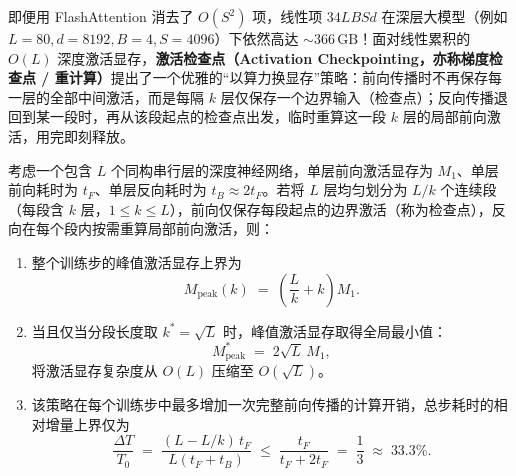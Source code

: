 即便用 FlashAttention 消去了 $O(S^2)$ 项，线性项 $34 L B S d$ 在深层大模型（例如 $L = 80, d = 8192, B = 4, S = 4096$）下依然高达 $\sim 366\,\mathrm{GB}$！面对线性累积的 $O(L)$ 深度激活显存，\textbf{激活检查点（Activation Checkpointing，亦称梯度检查点 / 重计算）}提出了一个优雅的“以算力换显存”策略：前向传播时不再保存每一层的全部中间激活，而是每隔 $k$ 层仅保存一个边界输入（检查点）；反向传播退回到某一段时，再从该段起点的检查点出发，临时重算这一段 $k$ 层的局部前向激活，用完即刻释放。

\begin{thmBox}
\begin{theorem}
\label{thm:activation-checkpointing}
考虑一个包含 $L$ 个同构串行层的深度神经网络，单层前向激活显存为 $M_1$、单层前向耗时为 $t_F$、单层反向耗时为 $t_B \approx 2 t_F$。若将 $L$ 层均匀划分为 $L / k$ 个连续段（每段含 $k$ 层，$1 \le k \le L$），前向仅保存每段起点的边界激活（称为检查点），反向在每个段内按需重算局部前向激活，则：
\begin{enumerate}
  \item 整个训练步的峰值激活显存上界为
  \begin{equation}
    M_{\mathrm{peak}}(k) \;=\; \left(\frac{L}{k} + k\right) M_1.
    \label{eq:ckpt-mem}
  \end{equation}
  \item 当且仅当分段长度取 $k^* = \sqrt{L}$ 时，峰值激活显存取得全局最小值：
  \begin{equation}
    M_{\mathrm{peak}}^* \;=\; 2\sqrt{L}\, M_1,
    \label{eq:ckpt-opt}
  \end{equation}
  将激活显存复杂度从 $O(L)$ 压缩至 $O(\sqrt{L})$。
  \item 该策略在每个训练步中最多增加一次完整前向传播的计算开销，总步耗时的相对增量上界仅为
  \begin{equation}
    \frac{\Delta T}{T_0} \;=\; \frac{(L - L/k)\, t_F}{L(t_F + t_B)} \;\le\; \frac{t_F}{t_F + 2 t_F} \;=\; \frac{1}{3} \;\approx\; 33.3\%.
    \label{eq:ckpt-overhead}
  \end{equation}
\end{enumerate}
\end{theorem}
\end{thmBox}

